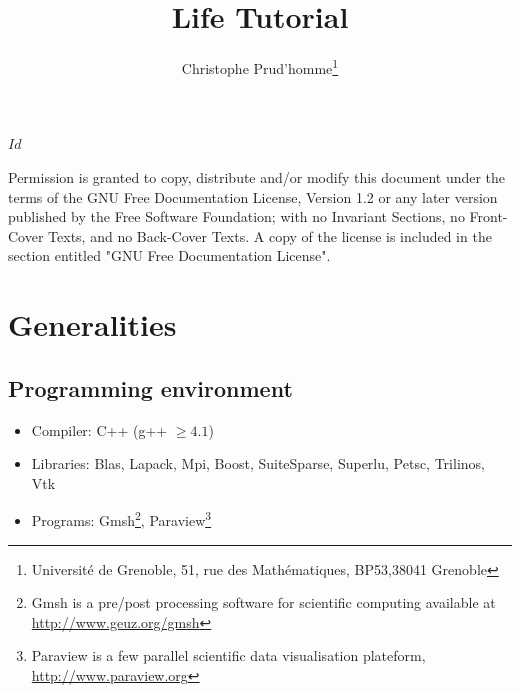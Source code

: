 \documentclass[11pt]{article}
\title{Life Tutorial}
\author{Christophe Prud'homme\thanks{Université de Grenoble,
51, rue des Mathématiques, BP53,38041 Grenoble}}
\date{\svnToday}
\begin{document}
\thispagestyle{empty}
\svnInfo $Id$





\maketitle

\newpage

\thispagestyle{empty}


\vfill
Permission is granted to copy, distribute and/or modify this document
under the terms of the GNU Free Documentation License, Version 1.2
or any later version published by the Free Software Foundation;
with no Invariant Sections, no Front-Cover Texts, and no Back-Cover Texts.
A copy of the license is included in the section entitled "GNU
Free Documentation License".

\newpage

\tableofcontents


\section{Generalities}

\subsection{Programming environment}

\begin{itemize}
\item Compiler: C++ (g++ $\geq 4.1$)
\item Libraries: Blas, Lapack, Mpi, Boost, SuiteSparse, Superlu, Petsc, Trilinos, Vtk
\item Programs: Gmsh\footnote{Gmsh is a pre/post processing software for scientific computing available at \url{http://www.geuz.org/gmsh}}, Paraview\footnote{Paraview is a few parallel scientific data visualisation plateform, \url{http://www.paraview.org}}
\end{itemize}
\end{document}
